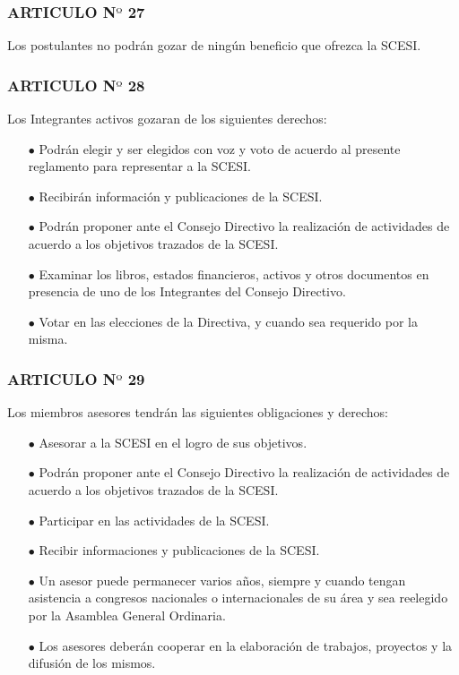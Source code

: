 \documentclass[11pt,letterpaper]{book}
\begin{document}
\subsubsection*{ARTICULO N$º$ 27}
Los postulantes no podrán gozar de ningún beneficio que ofrezca la SCESI.
\subsubsection*{ARTICULO N$º$ 28}
Los Integrantes activos gozaran de los siguientes derechos: 
\begin{itemize}
\item[$\bullet$] Podrán elegir y ser elegidos con voz y voto de acuerdo al presente reglamento para representar a la SCESI. 
\item[$\bullet$] Recibirán información y publicaciones de la SCESI. 
\item[$\bullet$] Podrán proponer ante el Consejo Directivo la realización de actividades de acuerdo a los objetivos trazados de la SCESI. 
\item[$\bullet$] Examinar los libros, estados financieros, activos  y otros documentos en presencia de uno de los Integrantes del Consejo Directivo. 
\item[$\bullet$] Votar en las elecciones de la Directiva, y cuando sea requerido por la misma. 
\end{itemize}
\subsubsection*{ARTICULO N$º$ 29}
Los miembros asesores tendrán las siguientes obligaciones y derechos: 
\begin{itemize}
\item[$\bullet$] Asesorar a la SCESI en el logro de sus objetivos. 
\item[$\bullet$] Podrán proponer ante el Consejo Directivo la realización de actividades de acuerdo a los objetivos trazados de la SCESI. 
\item[$\bullet$] Participar en las actividades de la SCESI. 
\item[$\bullet$] Recibir informaciones y publicaciones de la SCESI. 
\item[$\bullet$] Un asesor puede permanecer varios años, siempre y cuando tengan asistencia a congresos nacionales o internacionales de su área y sea reelegido por la Asamblea General Ordinaria. 
\item[$\bullet$] Los asesores deberán cooperar en la elaboración de trabajos, proyectos y la difusión de los mismos. 
\end{itemize}
\end{document}
